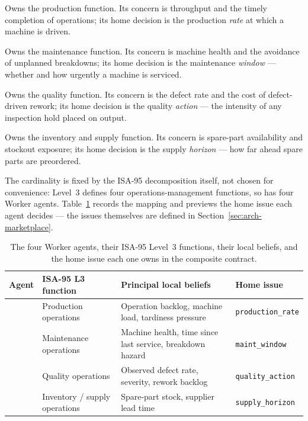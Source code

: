 \begin{description}[leftmargin=1.4em,style=nextline,itemsep=0.3em]
  \item[\PSA{} --- Production Scheduling Agent.] Owns the production
    function. Its concern is throughput and the timely completion of
    operations; its home decision is the production \emph{rate} at which
    a machine is driven.
  \item[\PMA{} --- Preventive Maintenance Agent.] Owns the maintenance
    function. Its concern is machine health and the avoidance of
    unplanned breakdowns; its home decision is the maintenance
    \emph{window} --- whether and how urgently a machine is serviced.
  \item[\QCA{} --- Quality Control Agent.] Owns the quality function.
    Its concern is the defect rate and the cost of defect-driven
    rework; its home decision is the quality \emph{action} --- the
    intensity of any inspection hold placed on output.
  \item[\SCA{} --- Supply Chain Agent.] Owns the inventory and supply
    function. Its concern is spare-part availability and stockout
    exposure; its home decision is the supply \emph{horizon} --- how far
    ahead spare parts are preordered.
\end{description}

The cardinality is fixed by the ISA-95 decomposition itself, not chosen
for convenience: Level~3 defines four operations-management functions,
so \NEXUS{} has four Worker agents. Table~\ref{tab:agents} records the
mapping and previews the home issue each agent decides --- the issues
themselves are defined in Section~\ref{sec:arch-marketplace}.

\begin{table}[ht]
\centering
\caption{The four Worker agents, their ISA-95 Level~3 functions, their
local beliefs, and the home issue each one owns in the composite
contract.}
\label{tab:agents}
\small
\begin{tabularx}{\textwidth}{@{}l l X l@{}}
\toprule
\textbf{Agent} & \textbf{ISA-95 L3 function} & \textbf{Principal local beliefs}
  & \textbf{Home issue} \\
\midrule
\PSA{} & Production operations & Operation backlog, machine load, tardiness
  pressure & \texttt{production\_rate} \\
\PMA{} & Maintenance operations & Machine health, time since last service,
  breakdown hazard & \texttt{maint\_window} \\
\QCA{} & Quality operations & Observed defect rate, severity, rework backlog
  & \texttt{quality\_action} \\
\SCA{} & Inventory / supply operations & Spare-part stock, supplier lead time
  & \texttt{supply\_horizon} \\
\bottomrule
\end{tabularx}
\end{table}

